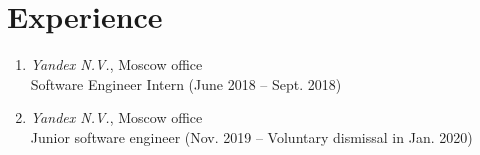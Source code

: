 \documentclass[twocolumn,10pt]{extarticle}
\begin{document}
\section{Experience}

\begin{enumerate}
  \item \textit{Yandex N.V.}, Moscow office \\
    \quad Software Engineer Intern (June 2018 -- Sept. 2018)
  \item \textit{Yandex N.V.}, Moscow office \\
    \quad Junior software engineer (Nov. 2019 -- Voluntary dismissal in Jan. 2020)
\end{enumerate}
\end{document}

